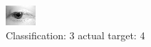 \begin{figure}[h!]
\begin{center}
\includegraphics[width=0.60\columnwidth]{figures/ID2557_class_3_target_4.png}
\end{center}
\caption{ Classification: 3 actual target: 4}
\label{fig:ID2557_class_3_target_4}
\end{figure}
